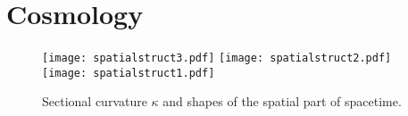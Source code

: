\chapter{Cosmology}
\begin{figure}[hbtp!]
\centering
 \texttt{[image: spatialstruct3.pdf]}\hspace{-1.5cm}
 \texttt{[image: spatialstruct2.pdf]}\hspace{-1.5cm}
 \texttt{[image: spatialstruct1.pdf]}
\caption{Sectional curvature $\kappa$ and shapes of the spatial part
of spacetime.}
\end{figure}
